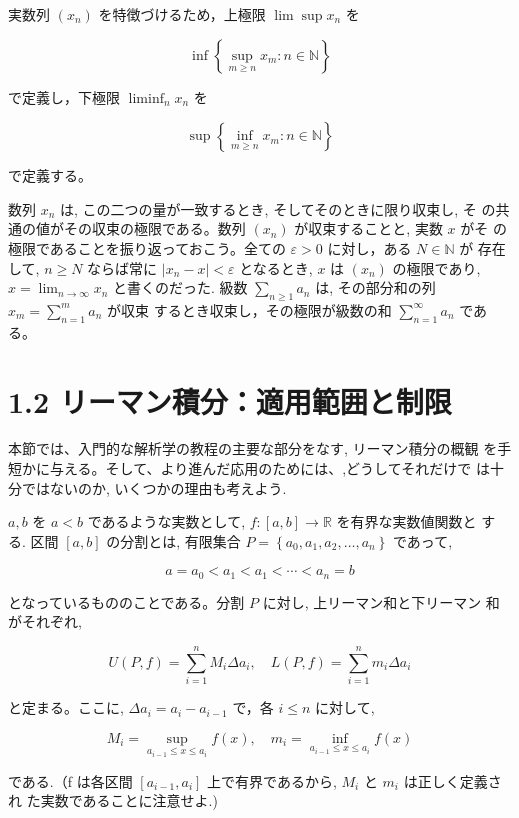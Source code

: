 \documentclass[14pt]{jsarticle}
\begin{document}
実数列 $\left(x_{n}\right)$ を特徴づけるため，上極限 $\lim \sup x_{n}$ を

$$
\inf \left\{\sup _{m \geq n} x_{m}: n \in \mathbb{N}\right\}
$$

で定義し，下極限 $\liminf _{n} x_{n}$ を

$$
\sup \left\{\inf _{m \geq n} x_{m}: n \in \mathbb{N}\right\}
$$

で定義する。

数列 $x_{n}$ は, この二つの量が一致するとき, そしてそのときに限り収束し, そ の共通の値がその収束の極限である。数列 $\left(x_{n}\right)$ が収束することと, 実数 $x$ がそ の極限であることを振り返っておこう。全ての $\varepsilon>0$ に対し，ある $N \in \mathbb{N}$ が 存在して, $n \geq N$ ならば常に $\left|x_{n}-x\right|<\varepsilon$ となるとき, $x$ は $\left(x_{n}\right)$ の極限であり, $x=\lim _{n \rightarrow \infty} x_{n}$ と書くのだった. 級数 $\sum_{n \geq 1} a_{n}$ は, その部分和の列 $x_{m}=\sum_{n=1}^{m} a_{n}$ が収束 するとき収束し，その極限が級数の和 $\sum_{n=1}^{\infty} a_{n}$ である。

\section*{1.2 リーマン積分：適用範囲と制限}
本節では、入門的な解析学の教程の主要な部分をなす, リーマン積分の概観 を手短かに与える。そして、より進んだ応用のためには、,どうしてそれだけで は十分ではないのか, いくつかの理由も考えよう.

$a, b$ を $a<b$ であるような実数として, $f:[a, b] \rightarrow \mathbb{R}$ を有界な実数値関数と する. 区間 $[a, b]$ の分割とは, 有限集合 $P=\left\{a_{0}, a_{1}, a_{2}, \ldots, a_{n}\right\}$ であって,

$$
a=a_{0}<a_{1}<a_{1}<\cdots<a_{n}=b
$$

となっているもののことである。分割 $P$ に対し, 上リーマン和と下リーマン 和がそれぞれ,

$$
U(P, f)=\sum_{i=1}^{n} M_{i} \Delta a_{i}, \quad L(P, f)=\sum_{i=1}^{n} m_{i} \Delta a_{i}
$$

と定まる。ここに, $\Delta a_{i}=a_{i}-a_{i-1}$ で，各 $i \leq n$ に対して,

$$
M_{i}=\sup _{a_{i-1} \leq x \leq a_{i}} f(x), \quad m_{i}=\inf _{a_{i-1} \leq x \leq a_{i}} f(x)
$$

である.（f は各区間 $\left[a_{i-1}, a_{i}\right]$ 上で有界であるから, $M_{i}$ と $m_{i}$ は正しく定義され た実数であることに注意せよ.)
\end{document}
